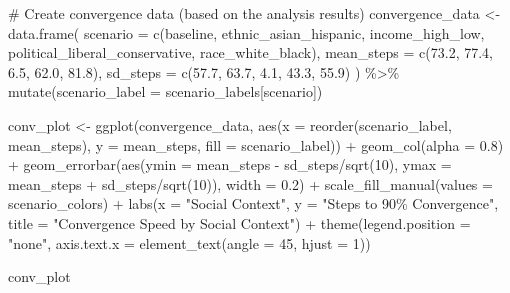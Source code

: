 \documentclass[
  11pt,
]{article}
\newenvironment{Shaded}{\begin{snugshade}}{\end{snugshade}}
\newcommand{\AttributeTok}[1]{\textcolor[rgb]{0.40,0.45,0.13}{#1}}
\newcommand{\CommentTok}[1]{\textcolor[rgb]{0.37,0.37,0.37}{#1}}
\newcommand{\DecValTok}[1]{\textcolor[rgb]{0.68,0.00,0.00}{#1}}
\newcommand{\FloatTok}[1]{\textcolor[rgb]{0.68,0.00,0.00}{#1}}
\newcommand{\FunctionTok}[1]{\textcolor[rgb]{0.28,0.35,0.67}{#1}}
\newcommand{\NormalTok}[1]{\textcolor[rgb]{0.00,0.23,0.31}{#1}}
\newcommand{\OtherTok}[1]{\textcolor[rgb]{0.00,0.23,0.31}{#1}}
\newcommand{\SpecialCharTok}[1]{\textcolor[rgb]{0.37,0.37,0.37}{#1}}
\newcommand{\StringTok}[1]{\textcolor[rgb]{0.13,0.47,0.30}{#1}}
\begin{document}
\begin{Shaded}
\begin{Highlighting}[]
\CommentTok{\# Create convergence data (based on the analysis results)}
\NormalTok{convergence\_data }\OtherTok{\textless{}{-}} \FunctionTok{data.frame}\NormalTok{(}
  \AttributeTok{scenario =} \FunctionTok{c}\NormalTok{(}\StringTok{\textquotesingle{}baseline\textquotesingle{}}\NormalTok{, }\StringTok{\textquotesingle{}ethnic\_asian\_hispanic\textquotesingle{}}\NormalTok{, }\StringTok{\textquotesingle{}income\_high\_low\textquotesingle{}}\NormalTok{, }
               \StringTok{\textquotesingle{}political\_liberal\_conservative\textquotesingle{}}\NormalTok{, }\StringTok{\textquotesingle{}race\_white\_black\textquotesingle{}}\NormalTok{),}
  \AttributeTok{mean\_steps =} \FunctionTok{c}\NormalTok{(}\FloatTok{73.2}\NormalTok{, }\FloatTok{77.4}\NormalTok{, }\FloatTok{6.5}\NormalTok{, }\FloatTok{62.0}\NormalTok{, }\FloatTok{81.8}\NormalTok{),}
  \AttributeTok{sd\_steps =} \FunctionTok{c}\NormalTok{(}\FloatTok{57.7}\NormalTok{, }\FloatTok{63.7}\NormalTok{, }\FloatTok{4.1}\NormalTok{, }\FloatTok{43.3}\NormalTok{, }\FloatTok{55.9}\NormalTok{)}
\NormalTok{) }\SpecialCharTok{\%\textgreater{}\%}
  \FunctionTok{mutate}\NormalTok{(}\AttributeTok{scenario\_label =}\NormalTok{ scenario\_labels[scenario])}

\NormalTok{conv\_plot }\OtherTok{\textless{}{-}} \FunctionTok{ggplot}\NormalTok{(convergence\_data, }\FunctionTok{aes}\NormalTok{(}\AttributeTok{x =} \FunctionTok{reorder}\NormalTok{(scenario\_label, mean\_steps), }
                                          \AttributeTok{y =}\NormalTok{ mean\_steps, }\AttributeTok{fill =}\NormalTok{ scenario\_label)) }\SpecialCharTok{+}
  \FunctionTok{geom\_col}\NormalTok{(}\AttributeTok{alpha =} \FloatTok{0.8}\NormalTok{) }\SpecialCharTok{+}
  \FunctionTok{geom\_errorbar}\NormalTok{(}\FunctionTok{aes}\NormalTok{(}\AttributeTok{ymin =}\NormalTok{ mean\_steps }\SpecialCharTok{{-}}\NormalTok{ sd\_steps}\SpecialCharTok{/}\FunctionTok{sqrt}\NormalTok{(}\DecValTok{10}\NormalTok{), }
                    \AttributeTok{ymax =}\NormalTok{ mean\_steps }\SpecialCharTok{+}\NormalTok{ sd\_steps}\SpecialCharTok{/}\FunctionTok{sqrt}\NormalTok{(}\DecValTok{10}\NormalTok{)), }\AttributeTok{width =} \FloatTok{0.2}\NormalTok{) }\SpecialCharTok{+}
  \FunctionTok{scale\_fill\_manual}\NormalTok{(}\AttributeTok{values =}\NormalTok{ scenario\_colors) }\SpecialCharTok{+}
  \FunctionTok{labs}\NormalTok{(}\AttributeTok{x =} \StringTok{"Social Context"}\NormalTok{, }\AttributeTok{y =} \StringTok{"Steps to 90\% Convergence"}\NormalTok{,}
       \AttributeTok{title =} \StringTok{"Convergence Speed by Social Context"}\NormalTok{) }\SpecialCharTok{+}
  \FunctionTok{theme}\NormalTok{(}\AttributeTok{legend.position =} \StringTok{"none"}\NormalTok{, }\AttributeTok{axis.text.x =} \FunctionTok{element\_text}\NormalTok{(}\AttributeTok{angle =} \DecValTok{45}\NormalTok{, }\AttributeTok{hjust =} \DecValTok{1}\NormalTok{))}

\NormalTok{conv\_plot}
\end{Highlighting}
\end{Shaded}
\end{document}
